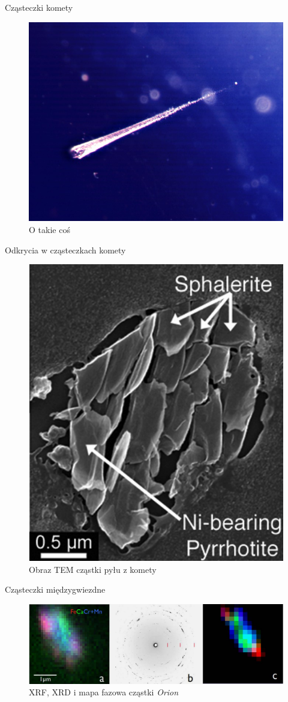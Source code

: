 \documentclass{beamer}
\begin{document}
\begin{frame}{Cząsteczki komety}
    \begin{figure}
        \centering
        \includegraphics[width=0.75\linewidth]{kosmos/eureca.png}
        \caption{O takie coś}
    \end{figure}
\end{frame}

\begin{frame}{Odkrycia w cząsteczkach komety}
    \begin{figure}
        \centering
        \includegraphics[width=0.5\linewidth]{kosmos/pyrr.png}
        \caption{Obraz TEM cząstki pyłu z komety}
    \end{figure}
\end{frame}

\begin{frame}{Cząsteczki międzygwiezdne}
    \begin{figure}
        \centering
        \includegraphics[width=0.99\linewidth]{kosmos/orion.png}
        \caption{XRF, XRD i mapa fazowa cząstki \emph{Orion}}
    \end{figure}
\end{frame}
\end{document}
